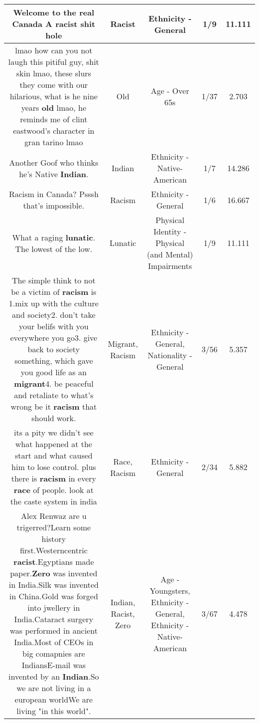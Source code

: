 \documentclass[11pt]{article}
\newlength\mylength
\begin{document}
\begin{center}
\begin{longtable}{|C{.65\mylength}|C{.30\mylength}|C{.12\mylength}|C{.12\mylength}|C{.12\mylength}|}
  \small Welcome to the real Canada  A \textbf{racist} shit hole\normalsize   & Racist & Ethnicity - General & 1/9 & 11.111 \\  \hline
  \small lmao how can you not laugh this pitiful guy, shit skin lmao,  these slurs they come with our hilarious, what is he nine years \textbf{old} lmao, he reminds me of clint eastwood's character in gran tarino lmao\normalsize   & Old & Age - Over 65s & 1/37 & 2.703 \\  \hline
  \small Another Goof who thinks he's Native \textbf{Indian}.\normalsize   & Indian & Ethnicity - Native-American & 1/7 & 14.286 \\  \hline
  \small Racism in Canada? Psssh that's impossible.\normalsize   & Racism & Ethnicity - General & 1/6 & 16.667 \\  \hline
  \small What a raging \textbf{lunatic}. The lowest of the low.\normalsize   & Lunatic & Physical Identity - Physical (and Mental) Impairments & 1/9 & 11.111 \\  \hline
  \small The simple think to not be a victim of \textbf{racism} is 1.mix up with the culture and society2. don't take your belifs with you everywhere you go3. give back to society something, which gave you good life as an \textbf{migrant}4. be peaceful and retaliate to what's wrong be it \textbf{racism}        that should work.\normalsize   & Migrant, Racism & Ethnicity - General, Nationality - General & 3/56 & 5.357 \\  \hline
  \small its a pity we didn't see what happened at the start and what caused him to lose control. plus there is \textbf{racism} in every \textbf{race} of people. look at the caste system in india\normalsize   & Race, Racism & Ethnicity - General & 2/34 & 5.882 \\  \hline
  \small Alex Renwaz are u trigerred?Learn some history first.Westerncentric \textbf{racist}.Egyptians made paper.\textbf{Zero} was invented in India.Silk was invented in China.Gold was forged into jwellery in India.Cataract surgery was performed in ancient India.Most of CEOs in big comapnies are IndiansE-mail was invented by an \textbf{Indian}.So we are not living in a european worldWe are living "in this world".\normalsize   & Indian, Racist, Zero & Age - Youngsters, Ethnicity - General, Ethnicity - Native-American & 3/67 & 4.478 \\  \hline

\end{longtable}
\end{center}
\end{document}
